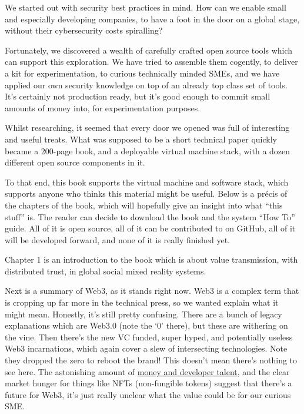 We started out with security best practices in mind. How can we enable small and especially developing companies, to have a foot in the door on a global stage, without their cybersecurity costs spiralling? \par
Fortunately, we discovered a wealth of carefully crafted open source tools which can support this exploration. We have tried to assemble them cogently, to deliver a kit for experimentation, to curious technically minded SMEs, and we have applied our own security knowledge on top of an already top class set of tools. It’s certainly not production ready, but it's good enough to commit small amounts of money into, for experimentation purposes.\par
Whilst researching, it seemed that every door we opened was full of interesting and useful treats. What was supposed to be a short technical paper quickly became a 200-page book, and a deployable virtual machine stack, with a dozen different open source components in it. \par
To that end, this book supports the virtual machine and software stack, which supports anyone who thinks this material might be useful. Below is a précis of the chapters of the book, which will hopefully give an insight into what ``this stuff'' is. The reader can decide to download the book and the system ``How To'' guide. All of it is open source, all of it can be contributed to on GitHub, all of it will be developed forward, and none of it is really finished yet.\par
Chapter 1 is an introduction to the book which is about value transmission, with distributed trust, in global social mixed reality systems. \par
Next is a summary of Web3, as it stands right now. Web3 is a complex term that is cropping up far more in the technical press, so we wanted explain what it might mean. Honestly, it’s still pretty confusing. There are a bunch of legacy explanations which are Web3.0 (note the `0' there), but these are withering on the vine. Then there’s the new VC funded, super hyped, and potentially useless Web3 incarnations, which again cover a slew of intersecting technologies. Note they dropped the zero to reboot the brand! This doesn’t mean there’s nothing to see here. The astonishing amount of \href{https://mirror.xyz/tr3butor.eth/AlZPMq_syymAoi8M1VVb2xES9Twj1OeetJbEE7EWhiw}{money and developer talent}, and the clear market hunger for things like NFTs (non-fungible tokens) suggest that there’s a future for Web3, it’s just really unclear what the value could be for our curious SME.\par
